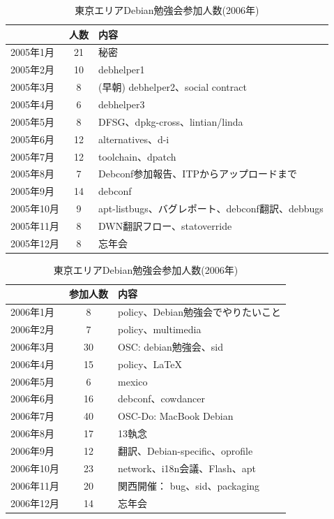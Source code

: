\documentclass[mingoth,a4paper]{jsarticle}
\begin{document}
\begin{table}[ht]
\begin{minipage}{0.5\hsize}
 \caption{東京エリアDebian勉強会参加人数(2005年)}\label{tab:count}
 \begin{center}
  \begin{tabular}{|l|c|p{10em}|}
 \hline
   & 人数 & 内容 \\
 \hline
   2005年1月 & 21 & 秘密\\
   2005年2月 & 10 & debhelper1\\
   2005年3月 & 8 &  (早朝) debhelper2、social contract\\
   2005年4月 & 6 & debhelper3\\
   2005年5月 & 8 & DFSG、dpkg-cross、lintian/linda\\
   2005年6月 & 12 & alternatives、d-i\\
   2005年7月 & 12 & toolchain、dpatch\\
   2005年8月 & 7 & Debconf参加報告、ITPからアップロードまで\\
   2005年9月 & 14 & debconf\\
   2005年10月 & 9 & apt-listbugs、バグレポート、debconf翻訳、debbugs\\
   2005年11月 & 8 & DWN翻訳フロー、statoverride\\
   2005年12月 & 8 & 忘年会\\
 \hline
  \end{tabular}
 \end{center}
\end{minipage}
\begin{minipage}{0.5\hsize}
 \caption{東京エリアDebian勉強会参加人数(2006年)}\label{tab:count2006}
 \begin{center}
  \begin{tabular}{|l|c|p{10em}|}
 \hline
 & 参加人数 & 内容\\
 \hline
 2006年1月 & 8 & policy、Debian勉強会でやりたいこと\\
 2006年2月 & 7 & policy、multimedia \\
 2006年3月 & 30 & OSC: debian勉強会、sid \\
 2006年4月 & 15 & policy、\LaTeX{} \\
 2006年5月 & 6 & mexico \\
 2006年6月 & 16 & debconf、cowdancer\\
 2006年7月 & 40 & OSC-Do: MacBook Debian \\
 2006年8月 & 17 & 13執念 \\
 2006年9月 & 12 & 翻訳、Debian-specific、oprofile \\
 2006年10月 & 23 & network、i18n会議、Flash、apt \\
 2006年11月 & 20 & 関西開催： bug、sid、packaging \\
 2006年12月 & 14 & 忘年会 \\
 \hline
  \end{tabular}
 \end{center}
\end{minipage}
 \end{table}
\end{document}
